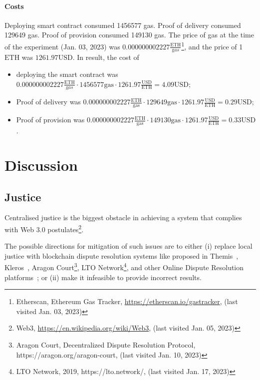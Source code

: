 \documentclass{ieeeaccess}
\begin{document}
\paragraph{Costs}
Deploying smart contract consumed 1456577 gas.
Proof of delivery consumed 129649 gas.
Proof of provision consumed 149130 gas.
The price of gas at the time of the experiment (Jan. 03, 2023) was $0.000000002227 \frac{\mathrm{ETH}}{\mathrm gas}$\footnote{Etherscan, Ethereum Gas Tracker, \url{https://etherscan.io/gastracker}, (last visited Jan. 03, 2023)}, and the price of 1 $\mathrm{ETH}$ was $1261.97 \mathrm{USD}$.
In result, the cost of 
\begin{itemize}
  \item deploying the smart contract was $0.000000002227 \frac{\mathrm{ETH}}{\mathrm gas} \cdot 1456577 \mathrm{gas} \cdot 1261.97 \frac{\mathrm{USD}}{\mathrm{ETH}} = 4.09 \mathrm{USD}$; 
  \item Proof of delivery was $0.000000002227 \mathrm{\frac{ETH}{gas}} \cdot 129649 \mathrm{gas} \cdot 1261.97 \frac{\mathrm{USD}}{\mathrm{ETH}} = 0.29 \mathrm{USD}$; 
  \item Proof of provision was $0.000000002227 \mathrm{\frac{ETH}{gas}} \cdot 149130 \mathrm{gas} \cdot 1261.97 \frac{\mathrm{USD}}{\mathrm{ETH}} = 0.33 \mathrm{USD}$.
\end{itemize}


\section{Discussion}
\label{sec:discussion}

\subsection{Justice}\label{sec:decentralised-justice}

Centralised justice is the biggest obstacle in achieving a system that complies with Web 3.0 postulates\footnote{Web3, \url{https://en.wikipedia.org/wiki/Web3}, (last visited Jan. 05, 2023)}.

The possible directions for mitigation of such issues are to either (i) replace local justice with blockchain dispute resolution systems like proposed in Themis~\cite{mengThemisDecentralizedEscrow2019}, Kleros~\cite{bergollaKlerosSociolegalCase2022,gudkovCrowdArbitrationBlockchain2020}, Aragon Court\footnote{Aragon Court, Decentralized Dispute Resolution Protocol, https://aragon.org/aragon-court, (last visited Jan. 10, 2023)}, LTO Network\footnote{LTO Network, 2019, https://lto.network/, (last visited Jan. 17, 2023)}, and other Online Dispute Resolution platforms~\cite{allenGovernanceBlockchainDispute2019}; or (ii) make it infeasible to provide incorrect results.
\end{document}
